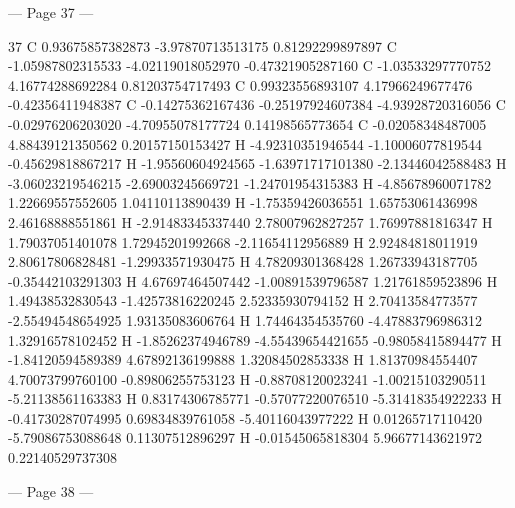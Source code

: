 \documentclass{article}
\begin{document}
--- Page 37 ---
 
37 
  C   0.93675857382873     -3.97870713513175      0.81292299897897 
  C   -1.05987802315533     -4.02119018052970     -0.47321905287160 
  C   -1.03533297770752      4.16774288692284      0.81203754717493 
  C   0.99323556893107      4.17966249677476     -0.42356411948387 
  C   -0.14275362167436     -0.25197924607384     -4.93928720316056 
  C   -0.02976206203020     -4.70955078177724      0.14198565773654 
  C   -0.02058348487005      4.88439121350562      0.20157150153427 
  H   -4.92310351946544     -1.10006077819544     -0.45629818867217 
  H   -1.95560604924565     -1.63971717101380     -2.13446042588483 
  H   -3.06023219546215     -2.69003245669721     -1.24701954315383 
  H   -4.85678960071782      1.22669557552605      1.04110113890439 
  H   -1.75359426036551      1.65753061436998      2.46168888551861 
  H   -2.91483345337440      2.78007962827257      1.76997881816347 
  H   1.79037051401078      1.72945201992668     -2.11654112956889 
  H   2.92484818011919      2.80617806828481     -1.29933571930475 
  H   4.78209301368428      1.26733943187705     -0.35442103291303 
  H   4.67697464507442     -1.00891539796587      1.21761859523896 
  H   1.49438532830543     -1.42573816220245      2.52335930794152 
  H   2.70413584773577     -2.55494548654925      1.93135083606764 
  H   1.74464354535760     -4.47883796986312      1.32916578102452 
  H   -1.85262374946789     -4.55439654421655     -0.98058415894477 
  H   -1.84120594589389      4.67892136199888      1.32084502853338 
  H   1.81370984554407      4.70073799760100     -0.89806255753123 
  H   -0.88708120023241     -1.00215103290511     -5.21138561163383 
  H   0.83174306785771     -0.57077220076510     -5.31418354922233 
  H   -0.41730287074995      0.69834839761058     -5.40116043977222 
  H   0.01265717110420     -5.79086753088648      0.11307512896297 
  H   -0.01545065818304      5.96677143621972      0.22140529737308 
 
 


--- Page 38 ---
 
\end{document}

